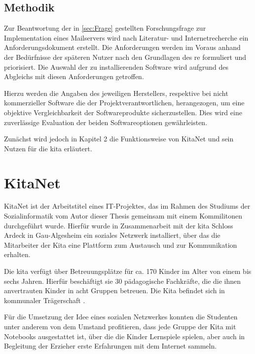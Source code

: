 \section{Methodik}

Zur Beantwortung der in \autoref{sec:Frage} gestellten Forschungsfrage zur Implementation eines Mailservers wird nach Literatur- und Internetrecherche ein Anforderungsdokument erstellt. Die Anforderungen werden im Voraus anhand der Bedürfnisse der späteren Nutzer nach den Grundlagen des \ac{re} formuliert und priorisiert.
Die Auswahl der zu installierenden Software wird aufgrund des Abgleichs mit diesen Anforderungen getroffen.

Hierzu werden die Angaben des jeweiligen Herstellers, respektive bei nicht kommerzieller Software die der Projektverantwortlichen, herangezogen, um eine objektive Vergleichbarkeit der Softwareprodukte sicherzustellen.
Dies wird eine zuverlässige Evaluation der beiden Softwareoptionen gewährleisten. 

Zunächst wird jedoch in Kapitel 2 die Funktionsweise von KitaNet und sein Nutzen für die \ac{kita} erläutert.

\chapter{KitaNet}
\label{sec:KitaNet}

KitaNet ist der Arbeitstitel eines IT-Projektes, das im Rahmen des Studiums der Sozialinformatik vom Autor dieser Thesis gemeinsam mit einem Kommilitonen durchgeführt wurde. Hierfür wurde in Zusammenarbeit mit der \ac{kita} Schloss Ardeck in Gau-Algesheim ein soziales Netzwerk installiert, über das die Mitarbeiter der Kita eine Plattform zum Austausch und zur Kommunikation erhalten. 

Die \ac{kita} verfügt über Betreuungsplätze für ca. 170 Kinder im Alter von einem bis sechs Jahren. Hierfür beschäftigt sie 30 pädagogische Fachkräfte, die die ihnen anvertrauten Kinder in acht Gruppen betreuen. Die Kita befindet sich in kommunaler Trägerschaft \citep[vgl.][]{kitaweb}.

Für die Umsetzung der Idee eines sozialen Netzwerkes konnten die Studenten unter anderem von dem Umstand profitieren, dass jede Gruppe der Kita mit Notebooks ausgestattet ist, über die die Kinder Lernspiele spielen, aber auch in Begleitung der Erzieher erste Erfahrungen mit dem Internet sammeln.

